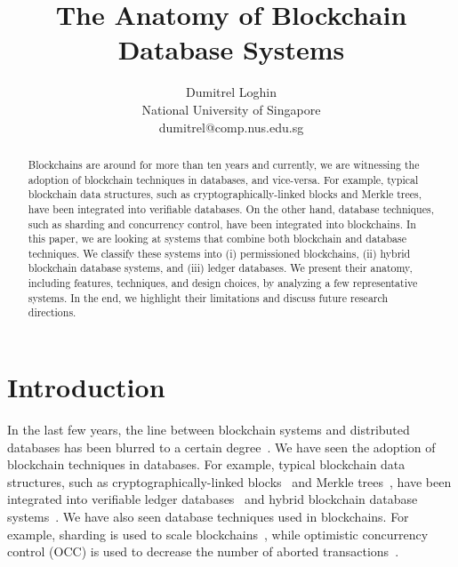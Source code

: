 \documentclass[11pt]{article}
\begin{document}
\title{The Anatomy of Blockchain Database Systems}
\author{Dumitrel Loghin \\ National University of Singapore \\ dumitrel@comp.nus.edu.sg}

\maketitle

\begin{abstract}

Blockchains are around for more than ten years and currently, we are witnessing the adoption of blockchain techniques in databases, and vice-versa. For example, typical blockchain data structures, such as cryptographically-linked blocks and Merkle trees, have been integrated into verifiable databases. On the other hand, database techniques, such as sharding and concurrency control, have been integrated into blockchains. In this paper, we are looking at systems that combine both blockchain and database techniques. We classify these systems into (i) permissioned blockchains, (ii) hybrid blockchain database systems, and (iii) ledger databases. We present their anatomy, including features, techniques, and design choices, by analyzing a few representative systems. In the end, we highlight their limitations and discuss future research directions.

\end{abstract}
 
\section{Introduction}

In the last few years, the line between blockchain systems and distributed databases has been blurred to a certain degree~\cite{rpc_sigmod21, sharma_sigmod19}. We have seen the adoption of blockchain techniques in databases. For example, typical blockchain data structures, such as cryptographically-linked blocks~\cite{fabric} and Merkle trees~\cite{merkle_tree}, have been integrated into verifiable ledger databases~\cite{qldb, sqlledger2021, ledgerdb, spitz} and hybrid blockchain database systems~\cite{loghin_vldb2022}. We have also seen database techniques used in blockchains. For example, sharding is used to scale blockchains~\cite{anh_sigmod19}, while optimistic concurrency control (OCC) is used to decrease the number of aborted transactions~\cite{sharma_sigmod19, rpc_sigmod20}.
\end{document}
